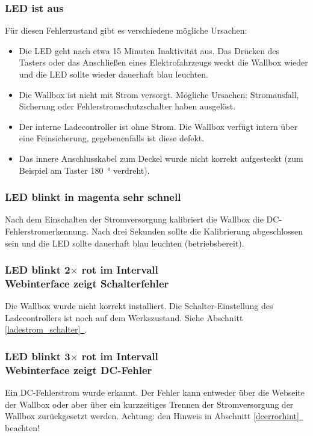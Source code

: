 \documentclass[a4paper,10pt]{article}
\newcommand*{\fullref}[1]{Abschnitt \hyperref[{#1}]{\ref*{#1}~\nameref*{#1}}}
\begin{document}
\begin{multicols*}{2}
    \subsubsection*{LED ist aus}
    Für diesen Fehlerzustand gibt es verschiedene mögliche Ursachen:
    \begin{itemize}
        \item Die LED geht nach etwa 15 Minuten Inaktivität aus. Das Drücken des Tasters
              oder das Anschließen eines Elektrofahrzeugs weckt die Wallbox wieder
              und die LED sollte wieder dauerhaft blau leuchten.
        \item Die Wallbox ist nicht mit Strom versorgt. Mögliche Ursachen: Stromausfall,
              Sicherung oder Fehlerstrom\-schutzschalter haben ausgelöst.
        \item Der interne Ladecontroller ist ohne Strom. Die Wallbox verfügt
		intern über eine Feinsicherung, gegebenenfalls ist diese defekt.
        \item Das innere Anschlusskabel zum Deckel wurde nicht korrekt aufgesteckt (zum Beispiel am Taster \SI{180}{\degree} verdreht).
    \end{itemize}

    \subsubsection*{LED blinkt in magenta sehr schnell}\label{fast_blink}
    Nach dem Einschalten der Stromversorgung kalibriert die Wallbox die
    DC-Fehlerstromerkennung. Nach drei Sekunden sollte die Kalibrierung
    abgeschlossen sein und die LED sollte dauerhaft blau leuchten
    (betriebsbereit).

    \subsubsection*{LED blinkt 2$\times$ rot im Intervall \\ Webinterface zeigt Schalterfehler}
    Die Wallbox wurde nicht korrekt installiert. Die Schalter-Einstellung des Ladecontrollers ist
    noch auf dem Werkszustand. Siehe \fullref{ladestrom_schalter}.

    \begin{minipage}{\linewidth} %
        \subsubsection*{LED blinkt 3$\times$ rot im Intervall \\ Webinterface zeigt DC-Fehler}
        Ein DC-Fehlerstrom wurde erkannt. Der Fehler kann entweder über die Webseite der Wallbox oder aber über
        ein kurzzeitiges Trennen der Stromversorgung der Wallbox zurückgesetzt
        werden. Achtung: den Hinweis in \fullref{dcerrorhint} beachten!
    \end{minipage}


\end{multicols*}
\end{document}

